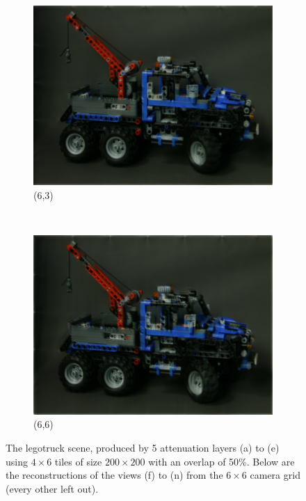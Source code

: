 \documentclass[11pt,a4paper,titlepage]{article}
\begin{document}
\begin{figure}
\begin{subfigure}[t]{0.31\textwidth}
		\includegraphics[width=\textwidth]{results/tiles_legotruck_6x6x480x640_480x640x5_tiling_4x6x200x200_overlap_0.5/Reconstruction_of_view_(6,3).png}
		\caption{(6,3)}
	\end{subfigure}%
	~
	\begin{subfigure}[t]{0.31\textwidth}
		\includegraphics[width=\textwidth]{results/tiles_legotruck_6x6x480x640_480x640x5_tiling_4x6x200x200_overlap_0.5/Reconstruction_of_view_(6,6).png}
		\caption{(6,6)}
	\end{subfigure}%
	
	\caption{The legotruck scene, produced by 5 attenuation layers (a) to (e) using $4 \times 6$ tiles of size $200 \times 200$ with an overlap of 50\%. Below are the reconstructions of the views (f) to (n) from the $6 \times 6$ camera grid (every other left out).}
	\label{fig:Legotruck_scene_layers and_reconstructions_using_tiles}
\end{figure}
\end{document}
